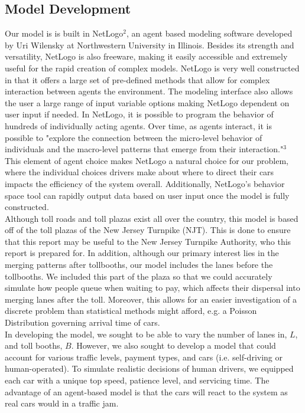 \documentclass{article}
\begin{document}
\subsection{Model Development}
Our model is is built in NetLogo$^{\text{2}}$, an agent based modeling software developed by Uri Wilensky at Northwestern University in Illinois. Besides its strength and versatility, NetLogo is also freeware, making it easily accessible and extremely useful for the rapid creation of complex models. NetLogo is very well constructed in that it offers a large set of pre-defined methods that allow for complex interaction between agents the environment. The modeling interface also allows the user a large range of input variable options making NetLogo dependent on user input if needed. In NetLogo, it is possible to program the behavior of hundreds of individually acting agents. Over time, as agents interact, it is possible to "explore the connection between the micro-level behavior of individuals and the macro-level patterns that emerge from their interaction."$^{\text{3}}$ This element of agent choice makes NetLogo a natural choice for our problem, where the individual choices drivers make about where to direct their cars impacts the efficiency of the system overall. Additionally, NetLogo's behavior space tool can rapidly output data based on user input once the model is fully constructed. \\

Although toll roads and toll plazas exist all over the country, this model is based off of the toll plazas of the New Jersey Turnpike (NJT). This is done to ensure that this report may be useful to the New Jersey Turnpike Authority, who this report is prepared for. In addition, although our primary interest lies in the merging patterns after tollbooths, our model includes the lanes before the tollbooths. We included this part of the plaza so that we could accurately simulate how people queue when waiting to pay, which affects their dispersal into merging lanes after the toll. Moreover, this allows for an easier investigation of a discrete problem than statistical methods might afford, e.g. a Poisson Distribution governing arrival time of cars.\\  

In developing the model, we sought to be able to vary the number of lanes in, $L$, and toll booths, $B$. However, we also sought to develop a model that could account for various traffic levels, payment types, and cars (i.e. self-driving or human-operated). To simulate realistic decisions of human drivers, we equipped each car with a unique top speed, patience level, and servicing time. The advantage of an agent-based model is that the cars will react to the system as real cars would in a traffic jam.
\end{document}

